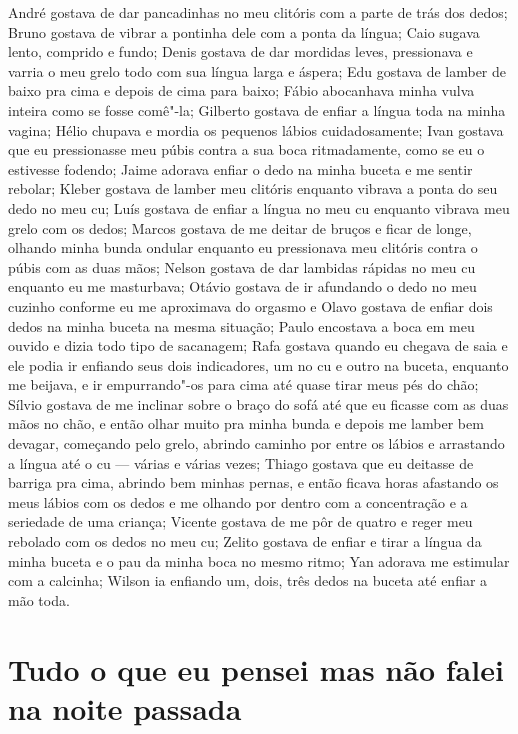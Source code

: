 André gostava de dar pancadinhas no meu clitóris com a parte de trás dos
dedos; Bruno gostava de vibrar a pontinha dele com a ponta da língua;
Caio sugava lento, comprido e fundo; Denis gostava de dar mordidas
leves, pressionava e varria o meu grelo todo com sua língua larga e
áspera; Edu gostava de lamber de baixo pra cima e depois de cima para
baixo; Fábio abocanhava minha vulva inteira como se fosse comê"-la;
Gilberto gostava de enfiar a língua toda na minha vagina; Hélio chupava
e mordia os pequenos lábios cuidadosamente; Ivan gostava que eu
pressionasse meu púbis contra a sua boca ritmadamente, como se eu o
estivesse fodendo; Jaime adorava enfiar o dedo na minha buceta e me
sentir rebolar; Kleber gostava de lamber meu clitóris enquanto vibrava a
ponta do seu dedo no meu cu; Luís gostava de enfiar a língua no meu cu
enquanto vibrava meu grelo com os dedos; Marcos gostava de me deitar de
bruços e ficar de longe, olhando minha bunda ondular enquanto eu
pressionava meu clitóris contra o púbis com as duas mãos; Nelson gostava
de dar lambidas rápidas no meu cu enquanto eu me masturbava; Otávio
gostava de ir afundando o dedo no meu cuzinho conforme eu me aproximava
do orgasmo e Olavo gostava de enfiar dois dedos na minha buceta na mesma
situação; Paulo encostava a boca em meu ouvido e dizia todo tipo de
sacanagem; Rafa gostava quando eu chegava de saia e ele podia ir
enfiando seus dois indicadores, um no cu e outro na buceta, enquanto me
beijava, e ir empurrando"-os para cima até quase tirar meus pés do chão;
Sílvio gostava de me inclinar sobre o braço do sofá até que eu ficasse
com as duas mãos no chão, e então olhar muito pra minha bunda e depois
me lamber bem devagar, começando pelo grelo, abrindo caminho por entre
os lábios e arrastando a língua até o cu --- várias e várias vezes;
Thiago gostava que eu deitasse de barriga pra cima, abrindo bem minhas
pernas, e então ficava horas afastando os meus lábios com os dedos e me
olhando por dentro com a concentração e a seriedade de uma criança;
Vicente gostava de me pôr de quatro e reger meu rebolado com os dedos no
meu cu; Zelito gostava de enfiar e tirar a língua da minha buceta e o
pau da minha boca no mesmo ritmo; Yan adorava me estimular com a
calcinha; Wilson ia enfiando um, dois, três dedos na buceta até enfiar a
mão toda.

\chapter{Tudo o que eu pensei mas não falei na noite passada}

